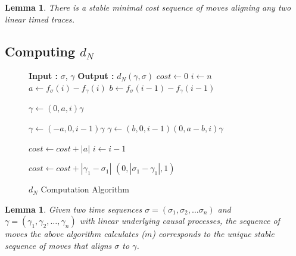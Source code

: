 \documentclass[conference]{IEEEtran}
\makeatletter
\newcommand{\removelatexerror}{\let\@latex@error\@gobble}
\newtheorem{lemma}[theorem]{Lemma}
\makeatother
\begin{document}
	\begin{lemma}\label{stablebest} There is a stable minimal cost sequence of moves aligning any two linear timed traces. 
	\end{lemma}
	
	\subsection{Computing $d_N$}
	
	\begin{figure}[!t]
		\removelatexerror
		\begin{algorithm}[H]
			\caption{$d_N$ Computation Algorithm}
			\label{MixBackwardsAlgo}
			\begin{algorithmic}
				\State \textbf{Input : }  $\sigma$, $\gamma$
				\State \textbf{Output : }  $d_N(\gamma, \sigma)$
				\State $cost \gets 0$
				\State $i \gets n$
				\State $a \gets f_\sigma(i) - f_\gamma(i)$
				\State $b \gets f_\sigma(i-1) - f_\gamma(i-1)$
				
			\State $\gamma \gets (0, a, i) \gamma$
			
		
		\State $\gamma \gets (-a, 0, i-1)\gamma$
		\Else
	\State $\gamma \gets (b, 0, i-1)(0, a-b, i) \gamma$
	\EndIf
	
	\State  $cost \gets cost + |a|$ 
	\State $i \gets i-1$
	\EndWhile
	
	\State $cost \gets cost + |\gamma_1 - \sigma_1|$  \Comment $(0, |\sigma_1- \gamma_1|, 1)$
	
\end{algorithmic}
\end{algorithm}
\end{figure}
\begin{lemma}\label {mixwordalgostable} Given two time sequences $\sigma = (\sigma_1, \sigma_2, \dots \sigma_n)$ and $\gamma = (\gamma_1, \gamma_2, \dots , \gamma_n)$ with linear underlying causal processes, the sequence of moves the above algorithm calculates ($m$) corresponds to the unique stable sequence of moves that aligns $\sigma$ to $\gamma$. 
\end{lemma}
\end{document}
